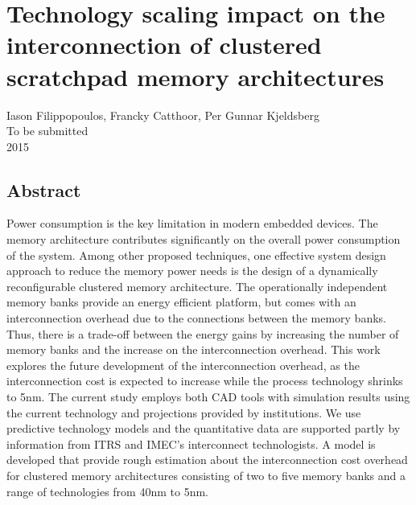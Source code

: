 
%


\chapter{Technology scaling impact on the interconnection of clustered scratchpad memory architectures}

\begin{center}
Iason Filippopoulos, Francky Catthoor, Per Gunnar Kjeldsberg
\\
To be submitted
\\
2015
\end{center}
\afterpage{\null\newpage}
\newpage

\vspace*{\fill}
\section*{\hspace*{\fill} Abstract \hspace*{\fill}}
Power consumption is the key limitation in modern embedded devices.
The memory architecture contributes significantly on the overall power consumption of the system.
Among other proposed techniques, one effective system design approach to reduce the memory power needs is the design of a dynamically reconfigurable clustered memory architecture.
The operationally independent memory banks provide an energy efficient platform, but comes with an interconnection overhead due to the connections between the memory banks. 
Thus, there is a trade-off between the energy gains by increasing the number of memory banks and the increase on the interconnection overhead.
This work explores the future development of the interconnection overhead, as the interconnection cost is expected to increase while the process technology shrinks to 5nm.
The current study employs both CAD tools with simulation results using the current technology and projections provided by institutions.
We use predictive technology models and the quantitative data are supported partly by information
from ITRS and IMEC's interconnect technologists.
A model is developed that provide rough estimation about the interconnection cost overhead for clustered memory architectures consisting of two to five memory banks and a range of technologies from 40nm to 5nm.  
\vspace*{\fill}
\afterpage{\null\newpage}
\newpage

